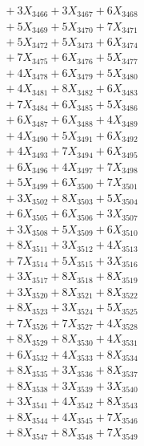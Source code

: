 \documentclass[a4paper,10pt]{article}
\begin{document}
{\begin{align}
&\;  + 3 X_{3466} + 3 X_{3467} + 6 X_{3468} \\[0.3ex]
&\;  + 5 X_{3469} + 5 X_{3470} + 7 X_{3471} \\[0.3ex]
&\;  + 5 X_{3472} + 5 X_{3473} + 6 X_{3474} \\[0.3ex]
&\;  + 7 X_{3475} + 6 X_{3476} + 5 X_{3477} \\[0.3ex]
&\;  + 4 X_{3478} + 6 X_{3479} + 5 X_{3480} \\[0.3ex]
&\;  + 4 X_{3481} + 8 X_{3482} + 6 X_{3483} \\[0.3ex]
&\;  + 7 X_{3484} + 6 X_{3485} + 5 X_{3486} \\[0.3ex]
&\;  + 6 X_{3487} + 6 X_{3488} + 4 X_{3489} \\[0.5ex]\allowbreak
&\;  + 4 X_{3490} + 5 X_{3491} + 6 X_{3492} \\[0.3ex]
&\;  + 4 X_{3493} + 7 X_{3494} + 6 X_{3495} \\[0.3ex]
&\;  + 6 X_{3496} + 4 X_{3497} + 7 X_{3498} \\[0.3ex]
&\;  + 5 X_{3499} + 6 X_{3500} + 7 X_{3501} \\[0.3ex]
&\;  + 3 X_{3502} + 8 X_{3503} + 5 X_{3504} \\[0.3ex]
&\;  + 6 X_{3505} + 6 X_{3506} + 3 X_{3507} \\[0.3ex]
&\;  + 3 X_{3508} + 5 X_{3509} + 6 X_{3510} \\[0.3ex]
&\;  + 8 X_{3511} + 3 X_{3512} + 4 X_{3513} \\[0.3ex]
&\;  + 7 X_{3514} + 5 X_{3515} + 3 X_{3516} \\[0.3ex]
&\;  + 3 X_{3517} + 8 X_{3518} + 8 X_{3519} \\[0.5ex]\allowbreak
&\;  + 3 X_{3520} + 8 X_{3521} + 8 X_{3522} \\[0.3ex]
&\;  + 8 X_{3523} + 3 X_{3524} + 5 X_{3525} \\[0.3ex]
&\;  + 7 X_{3526} + 7 X_{3527} + 4 X_{3528} \\[0.3ex]
&\;  + 8 X_{3529} + 8 X_{3530} + 4 X_{3531} \\[0.3ex]
&\;  + 6 X_{3532} + 4 X_{3533} + 8 X_{3534} \\[0.3ex]
&\;  + 8 X_{3535} + 3 X_{3536} + 8 X_{3537} \\[0.3ex]
&\;  + 8 X_{3538} + 3 X_{3539} + 3 X_{3540} \\[0.3ex]
&\;  + 3 X_{3541} + 4 X_{3542} + 8 X_{3543} \\[0.3ex]
&\;  + 8 X_{3544} + 4 X_{3545} + 7 X_{3546} \\[0.3ex]
&\;  + 8 X_{3547} + 8 X_{3548} + 7 X_{3549} \\[0.5ex]\allowbreak

\end{align}}
\end{document}
